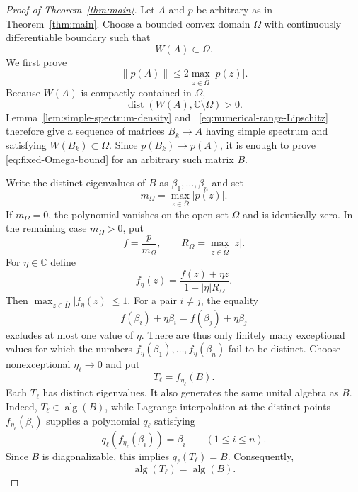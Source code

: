 \documentclass{aomart}
\theoremstyle{definition}
\newcommand{\C}{\mathbb C}
\newcommand{\alg}{\operatorname{alg}}
\newcommand{\dist}{\operatorname{dist}}
\begin{document}
\begin{proof}[Proof of Theorem~\ref{thm:main}]
Let $A$ and $p$ be arbitrary as in Theorem~\ref{thm:main}.  Choose a
bounded convex domain $\Omega$ with continuously differentiable boundary
such that
\begin{equation}
  W(A)\subset\Omega.
  \label{eq:WA-in-Omega}
\end{equation}
We first prove
\begin{equation}
  \lVert p(A)\rVert
  \leq2\max_{z\in\overline\Omega}\lvert p(z)\rvert.
  \label{eq:fixed-Omega-bound}
\end{equation}
Because $W(A)$ is compactly contained in $\Omega$,
\[
  \dist(W(A),\C\setminus\Omega)>0.
\]
Lemma~\ref{lem:simple-spectrum-density} and~%
\eqref{eq:numerical-range-Lipschitz} therefore give a sequence of
matrices $B_k\to A$ having simple spectrum and satisfying
$W(B_k)\subset\Omega$.  Since $p(B_k)\to p(A)$, it is enough to prove~%
\eqref{eq:fixed-Omega-bound} for an arbitrary such matrix $B$.

Write the distinct eigenvalues of $B$ as
$\beta_1,\ldots,\beta_n$ and set
\begin{equation}
  m_\Omega=\max_{z\in\overline\Omega}\lvert p(z)\rvert.
  \label{eq:m-Omega}
\end{equation}
If $m_\Omega=0$, the polynomial vanishes on the open set $\Omega$ and
is identically zero.  In the remaining case $m_\Omega>0$, put
\begin{equation}
  f=\frac{p}{m_\Omega},
  \qquad
  R_\Omega=\max_{z\in\overline\Omega}\lvert z\rvert.
  \label{eq:normalized-f}
\end{equation}
For $\eta\in\C$ define
\begin{equation}
  f_\eta(z)=
  \frac{f(z)+\eta z}{1+\lvert\eta\rvert R_\Omega}.
  \label{eq:f-eta}
\end{equation}
Then
$\max_{z\in\overline\Omega}\lvert f_\eta(z)\rvert\leq1$.
For a pair $i\neq j$,
the equality
\[
  f(\beta_i)+\eta\beta_i
  =f(\beta_j)+\eta\beta_j
\]
excludes at most one value of $\eta$.  There are thus only finitely
many exceptional values for which the numbers
$f_\eta(\beta_1),\ldots,f_\eta(\beta_n)$ fail to be distinct.  Choose
nonexceptional $\eta_\ell\to0$ and put
\begin{equation}
  T_\ell=f_{\eta_\ell}(B).
  \label{eq:T-ell}
\end{equation}
Each $T_\ell$ has distinct eigenvalues.  It also generates the same
unital algebra as $B$.  Indeed, $T_\ell\in\alg(B)$, while Lagrange
interpolation at the distinct points
$f_{\eta_\ell}(\beta_i)$ supplies a polynomial $q_\ell$ satisfying
\[
  q_\ell(f_{\eta_\ell}(\beta_i))=\beta_i
  \qquad(1\leq i\leq n).
\]
Since $B$ is diagonalizable, this implies
$q_\ell(T_\ell)=B$.  Consequently,
\begin{equation}
  \alg(T_\ell)=\alg(B).
  \label{eq:T-generates-B}
\end{equation}


\end{proof}
\end{document}
